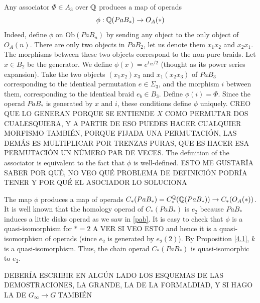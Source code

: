 \documentclass[TFM.tex]{subfiles}
\begin{document}
Any associator $\Phi\in A_3$ over $\mathbb{Q}$ produces a map of operads
\[
\phi:\mathbb{Q}(PaB_*)\to O_A(*)
\]
Indeed, define $\phi$ on $\mathrm{Ob}(PaB_n)$ by sending any object to the only object of $O_A(n)$.
There are only two objects in $PaB_2$, let us denote them $x_1x_2$ and $x_2x_1$. The morphisms
between these two objects correspond to the non-pure braids. Let $x\in B_2$
be the generator. We define $\phi(x)=e^{t_{12}/2}$ (thought as its power series expansion). Take the two objects $(x_1x_2)x_3$ and
$x_1(x_2x_3)$ of $PaB_3$ corresponding to the identical permutation $e \in \Sigma_3$, and the morphism
$i$ between them, corresponding to the identical braid $e_b\in B_3$. Define $\phi(i)=\Phi$.
Since the operad $PaB_*$ is generated by $x$ and $i$, these conditions define $\phi$ uniquely. CREO QUE LO GENERAN PORQUE SE ENTIENDE $X$ COMO PERMUTAR DOS CUALESQUIERA, Y A PARTIR DE ESO PUEDES HACER CUALQUIER MORFISMO TAMBIÉN, PORQUE FIJADA UNA PERMUTACIÓN, LAS DEMÁS ES MULTIPLICAR POR TRENZAS PURAS, QUE ES HACER ESA PERMUTACIÓN UN NÚMERO PAR DE VECES. The definition of the associator is equivalent to the fact that $\phi$ is well-defined. ESTO ME GUSTARÍA SABER POR QUÉ, NO VEO QUÉ PROBLEMA DE DEFINICIÓN PODRÍA TENER Y POR QUÉ EL ASOCIADOR LO SOLUCIONA

The map $\phi$ produces a map of operads $C_*(PaB_*)=C_*^{\mathbb{Q}}(\mathbb{Q}(PaB_*))\to C_*(O_A(*))$.
It is well known that the homology operad of $C_*(PaB_*)$ is $e_2$ because $PaB_*$ induces a little disks operad as we saw in \ref{pab}. It is easy to check that $\phi$ is a quasi-isomorphism for $*=2$ A VER SI VEO ESTO and hence it is a quasi-isomorphism of operads (since
$e_2$ is generated by $e_2(2)$). By Proposition \ref{4.1}, $k$ is a quasi-isomorphism. Thus, the
chain operad $C_*(PaB_*)$ is quasi-isomorphic to $e_2$.



DEBERÍA ESCRIBIR EN ALGÚN LADO LOS ESQUEMAS DE LAS DEMOSTRACIONES, LA GRANDE, LA DE LA FORMALDIAD, Y SI HAGO LA DE $G_\infty\to G$ TAMBIÉN
\end{document}
